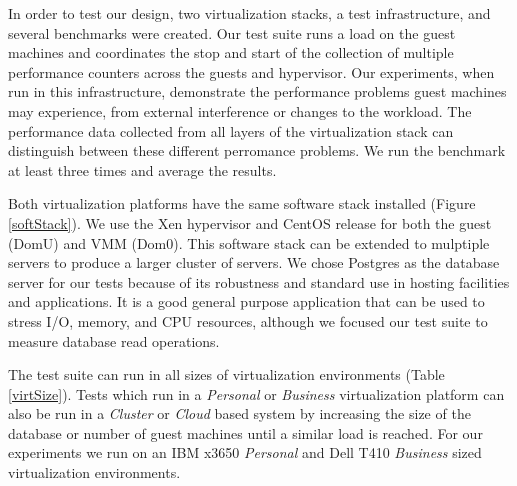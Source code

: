 In order to test our design, two virtualization stacks, a test infrastructure, and several benchmarks were created.  Our test suite runs a load on the guest machines and coordinates the stop and start of the collection of multiple performance counters across the guests and hypervisor.     
Our experiments, when run in this infrastructure, demonstrate the performance problems guest machines may experience, from external interference or changes to the workload.  The performance data collected from all layers of the virtualization stack can distinguish between these different perromance problems.  We run the benchmark at least three times and average the results.

Both virtualization platforms have the same software stack installed (Figure \ref{softStack}).  
We use the Xen hypervisor and CentOS release for both the guest (DomU) and VMM (Dom0).  
This software stack can be extended to mulptiple servers to produce a larger cluster of servers.  
We chose Postgres as the database server for our tests because of its robustness and standard use in hosting facilities and applications.  
It is a good general purpose application that can be used to stress I/O, memory, and CPU resources, although we focused our test suite to measure database read operations.

The test suite can run in all sizes of virtualization environments (Table \ref{virtSize}).  
Tests which run in a \emph{Personal} or \emph{Business} virtualization platform can also be run in a \emph{Cluster} or \emph{Cloud} based system by increasing the size of the database or number of guest machines until a similar load is reached.  
For our experiments we run on an IBM x3650 \emph{Personal} and Dell T410 \emph{Business} sized virtualization environments. 

